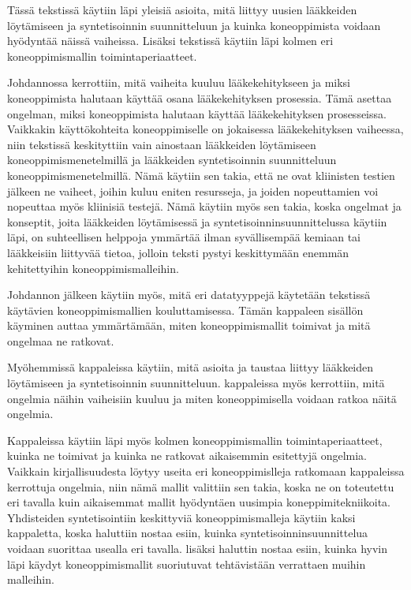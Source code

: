 \documentclass[finnish,twoside,censored,tkt,sw-line]{HYthesisML}
\begin{document}

Tässä tekstissä käytiin läpi yleisiä asioita, mitä liittyy uusien lääkkeiden löytämiseen ja syntetisoinnin suunnitteluun ja kuinka koneoppimista voidaan hyödyntää näissä vaiheissa.
Lisäksi tekstissä käytiin läpi kolmen eri koneoppimismallin toimintaperiaatteet.

Johdannossa kerrottiin, mitä vaiheita kuuluu lääkekehitykseen ja miksi koneoppimista halutaan käyttää osana lääkekehityksen prosessia.
Tämä asettaa ongelman, miksi koneoppimista halutaan käyttää lääkekehityksen prosesseissa.
Vaikkakin käyttökohteita koneoppimiselle on jokaisessa lääkekehityksen vaiheessa, niin tekstissä keskityttiin vain ainostaan lääkkeiden löytämiseen koneoppimismenetelmillä ja lääkkeiden syntetisoinnin suunnitteluun koneoppimismenetelmillä.
Nämä käytiin sen takia, että ne ovat kliinisten testien jälkeen ne vaiheet, joihin kuluu eniten resursseja, ja joiden nopeuttamien voi nopeuttaa myös kliinisiä testejä.
Nämä käytiin myös sen takia, koska ongelmat ja konseptit, joita lääkkeiden löytämisessä ja syntetisoinninsuunnittelussa käytiin läpi, on suhteellisen helppoja ymmärtää ilman syvällisempää kemiaan tai lääkkeisiin liittyvää tietoa, jolloin teksti pystyi keskittymään enemmän kehitettyihin koneoppimismalleihin.

Johdannon jälkeen käytiin myös, mitä eri datatyyppejä käytetään tekstissä käytävien koneoppimismallien kouluttamisessa.
Tämän kappaleen sisällön käyminen auttaa ymmärtämään, miten koneoppimismallit toimivat ja mitä ongelmaa ne ratkovat.

Myöhemmissä kappaleissa käytiin, mitä asioita ja taustaa liittyy lääkkeiden löytämiseen ja syntetisoinnin suunnitteluun.
kappaleissa myös kerrottiin, mitä ongelmia näihin vaiheisiin kuuluu ja miten koneoppimisella voidaan ratkoa näitä ongelmia.

Kappaleissa käytiin läpi myös kolmen koneoppimismallin toimintaperiaatteet, kuinka ne toimivat ja kuinka ne ratkovat aikaisemmin esitettyjä ongelmia.
Vaikkain kirjallisuudesta löytyy useita eri koneoppimislleja ratkomaan kappaleissa kerrottuja ongelmia, niin nämä mallit valittiin sen takia, koska ne on toteutettu eri tavalla kuin aikaisemmat mallit hyödyntäen uusimpia koneppimitekniikoita.
Yhdisteiden syntetisointiin keskittyviä koneoppimismalleja käytiin kaksi kappaletta, koska haluttiin nostaa esiin, kuinka syntetisoinninsuunnittelua voidaan suorittaa usealla eri tavalla.
lisäksi haluttin nostaa esiin, kuinka hyvin läpi käydyt koneoppimismallit suoriutuvat tehtävistään verrattaen muihin malleihin.
\end{document}
